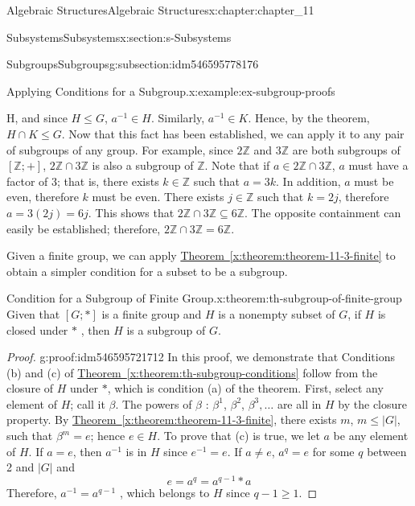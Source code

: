 \documentclass[oneside,10pt,]{book}
\newcommand{\xreffont}{\relax}
\numberwithin{equation}{section}
\begin{document}
\begin{chapterptx}{Algebraic Structures}{}{Algebraic Structures}{}{}{x:chapter:chapter_11}
\begin{sectionptx}{Subsystems}{}{Subsystems}{}{}{x:section:s-Subsystems}
\begin{subsectionptx}{Subgroups}{}{Subgroups}{}{}{g:subsection:idm546595778176}
\begin{example}{Applying Conditions for a Subgroup.}{x:example:ex-subgroup-proofs}
\begin{enumerate}[label=(\alph*)]
H\), and since \(H \leq  G\), \(a^{-1}\in  H\).  Similarly, \(a^{-1}\in K\). Hence, by the theorem,  \(H \cap  K \leq  G\). Now that this fact has been established, we can apply it to any pair of subgroups of any group. For example, since \(2\mathbb{Z}\) and \(3\mathbb{Z}\) are both subgroups of \([\mathbb{Z};+]\), \(2\mathbb{Z} \cap  3\mathbb{Z}\) is also a subgroup of \(\mathbb{Z}\). Note that if \(a \in 2\mathbb{Z}
\cap  3\mathbb{Z}\),  \(a\) must have a factor of 3; that is, there exists \(k\in \mathbb{Z}\) such that \(a = 3k\). In addition, \(a\) must be even, therefore \(k\) must be even. There exists \(j \in  \mathbb{Z}\) such that \(k = 2j\), therefore \(a = 3(2j)= 6j\).  This shows that \(2\mathbb{Z}\cap  3\mathbb{Z}\subseteq  6\mathbb{Z}\). The opposite containment can easily be established; therefore, \(2\mathbb{Z} \cap  3\mathbb{Z}
= 6\mathbb{Z}\).%
\end{enumerate}
%
\end{example}
Given a finite group, we can apply \hyperref[x:theorem:theorem-11-3-finite]{Theorem~{\xreffont\ref{x:theorem:theorem-11-3-finite}}} to obtain a simpler condition for a subset to be a subgroup.%
\begin{theorem}{Condition for a Subgroup of Finite Group.}{}{x:theorem:th-subgroup-of-finite-group}%
Given that \([G; * ]\) is a finite group and \(H\) is a nonempty subset of \(G\), if \(H\) is closed under \(*\) , then \(H\) is a subgroup of \(G\).%
\end{theorem}
\begin{proof}{}{g:proof:idm546595721712}
In this proof, we demonstrate that Conditions (b) and (c) of \hyperref[x:theorem:th-subgroup-conditions]{Theorem~{\xreffont\ref{x:theorem:th-subgroup-conditions}}} follow from the closure of \(H\) under \(*\), which is condition (a) of the theorem.  First, select any element of \(H\); call it \(\beta\). The powers of \(\beta\) : \(\beta ^1\), \(\beta ^2\), \(\beta^3,\ldots\) are all in \(H\) by the closure property. By \hyperref[x:theorem:theorem-11-3-finite]{Theorem~{\xreffont\ref{x:theorem:theorem-11-3-finite}}}, there exists \(m\), \(m\leq \left| G\right|\), such that \(\beta ^m = e\); hence \(e \in  H\). To prove that (c) is true, we let \(a\) be any element of \(H\). If \(a = e\), then \(a^{-1}\) is in \(H\) since \(e^{-1} = e\). If \(a\neq e\), \(a^q=e\) for some \(q\) between 2 and \(\left| G\right|\) and%
\begin{equation*}
e = a^q = a ^{q-1} * a
\end{equation*}
Therefore, \(a^{-1}= a^{q-1}\) , which belongs to \(H\) since \(q - 1 \geq  1\).%

\end{proof}
\end{subsectionptx}
\end{sectionptx}
\end{chapterptx}
\end{document}
